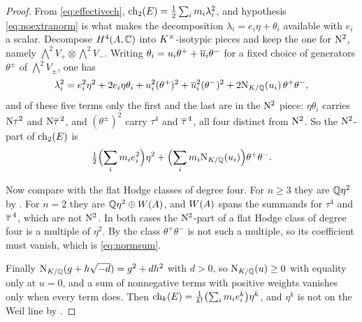 \begin{proof}
From \eqref{eq:effectivech},
$\operatorname{ch}_{2}(E)=\tfrac12\sum_{i}m_{i}\lambda_{i}^{2}$, and hypothesis
\eqref{eq:noextranorm} is what makes the decomposition
$\lambda_{i}=e_{i}\eta+\theta_{i}$ available with $e_{i}$ a scalar. Decompose
$H^{4}(A,\mathbb{C})$ into $K^{\times}$-isotypic pieces and keep the one for $\mathrm{N}^{2}$,
namely $\bigwedge^{2}V_{+}\otimes\bigwedge^{2}V_{-}$. Writing
$\theta_{i}=u_{i}\theta^{+}+\overline{u}_{i}\theta^{-}$ for a fixed choice of
generators $\theta^{\pm}$ of $\bigwedge^{2}V_{\pm}$, one has
\[
  \lambda_{i}^{2}
  =e_{i}^{2}\eta^{2}
   +2e_{i}\eta\theta_{i}
   +u_{i}^{2}(\theta^{+})^{2}+\overline{u}_{i}^{2}(\theta^{-})^{2}
   +2\mathrm{N}_{K/\mathbb{Q}}(u_{i})\,\theta^{+}\theta^{-},
\]
and of these five terms only the first and the last are in the $\mathrm{N}^{2}$
piece: $\eta\theta_{i}$ carries $\mathrm{N}\tau^{2}$ and $\mathrm{N}\overline{\tau}^{\,2}$, and
$(\theta^{\pm})^{2}$ carry $\tau^{4}$ and $\overline{\tau}^{\,4}$, all four distinct
from $\mathrm{N}^{2}$. So the $\mathrm{N}^{2}$-part of $\operatorname{ch}_{2}(E)$ is
\[
  \tfrac12\Bigl(\sum_{i}m_{i}e_{i}^{2}\Bigr)\eta^{2}
  +\Bigl(\sum_{i}m_{i}\mathrm{N}_{K/\mathbb{Q}}(u_{i})\Bigr)\theta^{+}\theta^{-}.
\]

Now compare with the flat Hodge classes of degree four. For $n\ge3$ they are
$\mathbb{Q}\eta^{2}$ by \cite[Theorem~4.14]{paperI}. For $n=2$ they are
$\mathbb{Q}\eta^{2}\oplus W(A)$, and $W(A)$ spans the summands for $\tau^{4}$ and
$\overline{\tau}^{\,4}$, which are not $\mathrm{N}^{2}$. In both cases the $\mathrm{N}^{2}$-part
of a flat Hodge class of degree four is a multiple of $\eta^{2}$. By
 the class $\theta^{+}\theta^{-}$ is not such a multiple,
so its coefficient must vanish, which is \eqref{eq:normsum}.

Finally $\mathrm{N}_{K/\mathbb{Q}}(g+h\sqrt{-d})=g^{2}+dh^{2}$ with $d>0$, so
$\mathrm{N}_{K/\mathbb{Q}}(u)\ge0$ with equality only at $u=0$, and a sum of nonnegative
terms with positive weights vanishes only when every term does. Then
$\operatorname{ch}_{k}(E)=\frac{1}{k!}\bigl(\sum_{i}m_{i}e_{i}^{k}\bigr)\eta^{k}$, and
$\eta^{k}$ is not on the Weil line by \cite[Theorem~4.14]{paperI}.
\end{proof}

